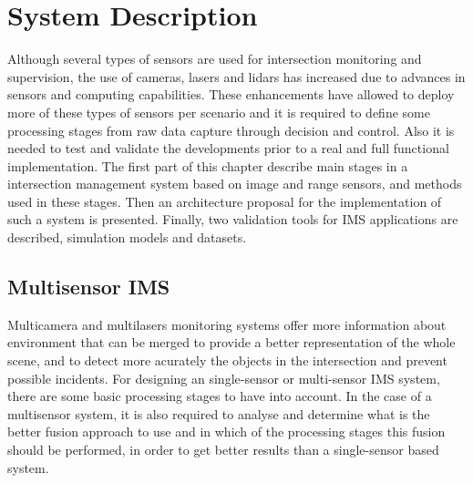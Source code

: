 
\chapter {System Description}

Although several types of sensors are used for intersection monitoring and supervision, the use of cameras, lasers and lidars has increased due to advances in sensors and computing capabilities. These enhancements have allowed to deploy more of these types of sensors per scenario and it is required to define some processing stages from raw data capture through decision and control. Also it is needed to test and validate the developments prior to a real and full functional implementation. The first part of this chapter describe main stages in a intersection management system based on image and range sensors, and methods used in these stages. Then an architecture proposal for the implementation of such a system is presented. Finally, two validation tools for IMS applications are described, simulation models and datasets.

\section{Multisensor IMS}

Multicamera and multilasers monitoring systems offer more information about environment that can be merged to provide a better representation of the whole scene, and to detect more acurately the objects in the intersection and prevent possible incidents. For designing an single-sensor or multi-sensor IMS system, there are some basic processing stages to have into account. In the case of a multisensor system, it is also required to analyse and determine what is the better fusion approach to use and in which of the processing stages this fusion should be performed, in order to get better results than a single-sensor based system.

